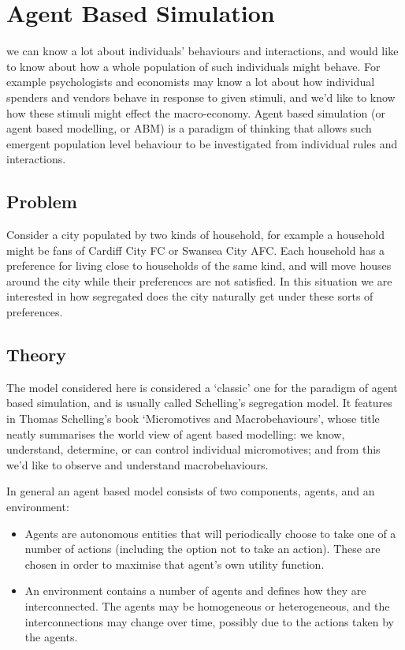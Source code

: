 \chapter[Agent Based Simulation]{Agent Based Simulation}

 we can know a lot about individuals' behaviours and
interactions, and would like to know about how a whole population of such
individuals might behave. For example psychologists and economists may know a
lot about how individual spenders and vendors behave in response to given
stimuli, and we'd like to know how these stimuli might effect the macro-economy.
Agent based simulation (or agent based modelling, or ABM) is a paradigm of
thinking that allows such emergent population level behaviour to be investigated
from individual rules and interactions.

\section{Problem}\label{sec:problem}
Consider a city populated by two kinds of household, for example a household
might be fans of Cardiff City FC or Swansea City AFC. Each household has a
preference for living close to households of the same kind, and will move houses
around the city while their preferences are not satisfied.
In this situation we are interested in how segregated does the city naturally
get under these sorts of preferences.

\section{Theory}\label{sec:theory}
The model considered here is considered a `classic' one for the paradigm of
agent based simulation, and is usually called Schelling's segregation model.
It features in Thomas Schelling's book `Micromotives and Macrobehaviours', whose
title neatly summarises the world view of agent based modelling: we know,
understand, determine, or can control individual micromotives; and from this
we'd like to observe and understand macrobehaviours.

In general an agent based model consists of two components, agents, and an
environment:
\begin{itemize}
  \item Agents are autonomous entities that will periodically choose to take one
  of a number of actions (including the option not to take an action). These are
  chosen in order to maximise that agent's own utility function.
  \item An environment contains a number of agents and defines how they are
  interconnected. The agents may be homogeneous or heterogeneous, and the
  interconnections may change over time, possibly due to the actions taken by
  the agents.
\end{itemize}

